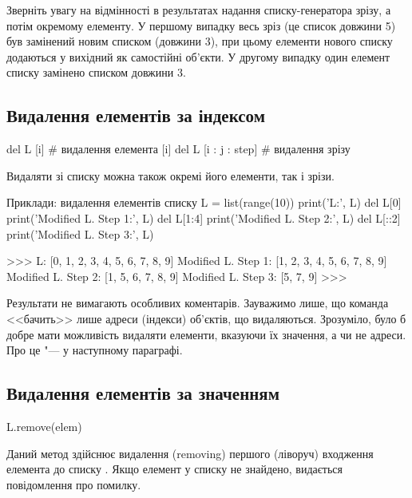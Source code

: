 Зверніть увагу на відмінності в результатах надання списку-генератора \-  зрізу, а потім окремому елементу. У першому випадку весь зріз  (це список довжини 5) був замінений новим списком (довжини 3), при цьому елементи нового списку додаються у вихідний як самостійні об'єкти. У другому випадку один елемент списку замінено списком довжини 3.

\subsection{Видалення елементів за індексом}

\begin{pydef}
del L [i] # видалення елемента [i]
del L [i : j : step] # видалення зрізу
\end{pydef}

Видаляти зі списку можна також окремі його елементи, так і зрізи.

\begin{pyr}{}
\begin{py}{Приклади: видалення елементів списку}
L = list(range(10))
print('L:', L)
del L[0]
print('Modified L. Step 1:', L)
del L[1:4]
print('Modified L. Step 2:', L)
del L[::2]
print('Modified L. Step 3:', L)
\end{py}
\tcblower
\begin{py}{}
>>>
L: [0, 1, 2, 3, 4, 5, 6, 7, 8, 9]
Modified L. Step 1: [1, 2, 3, 4, 5, 6, 7, 8, 9]
Modified L. Step 2: [1, 5, 6, 7, 8, 9]
Modified L. Step 3: [5, 7, 9]
>>>
\end{py}
\end{pyr}
\noindent Результати не вимагають особливих коментарів. Зауважимо лише, що команда  <<бачить>> лише адреси (індекси) об'єктів, що видаляються. Зрозуміло, було б добре мати можливість видаляти елементи, вказуючи їх значення, а чи не адреси. Про це "--- у наступному параграфі.

\subsection{Видалення елементів за значенням} \label{remove}

\begin{pydef}
L.remove(elem)
\end{pydef}

Даний метод здійснює видалення (removing) першого (ліворуч) входження елемента  до списку . Якщо елемент у списку не знайдено, видається повідомлення про помилку.

